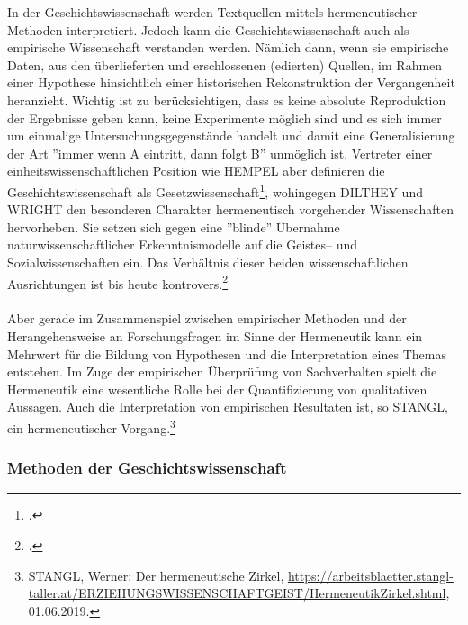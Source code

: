 \documentclass[12pt,a4paper]{article}
\begin{document}
In der Geschichtswissenschaft werden Textquellen mittels hermeneutischer Methoden interpretiert. Jedoch kann die Geschichtswissenschaft auch als empirische Wissenschaft verstanden werden. Nämlich dann, wenn sie empirische Daten, aus den überlieferten und erschlossenen (edierten) Quellen, im Rahmen einer Hypothese hinsichtlich einer historischen Rekonstruktion der Vergangenheit heranzieht. Wichtig ist zu berücksichtigen, dass es keine absolute Reproduktion der Ergebnisse geben kann, keine Experimente möglich sind und es sich immer um einmalige Untersuchungsgegenstände handelt und damit eine Generalisierung der Art ''immer wenn A eintritt, dann folgt B'' unmöglich ist. Vertreter einer einheitswissenschaftlichen Position wie HEMPEL aber definieren die Geschichtswissenschaft als Gesetzwissenschaft\footcite[][S.79-80]{nussel2018offenbarung}, wohingegen DILTHEY und WRIGHT den besonderen Charakter hermeneutisch vorgehender Wissenschaften hervorheben. Sie setzen sich gegen eine ''blinde'' Übernahme naturwissenschaftlicher Erkenntnismodelle auf die Geistes-- und Sozialwissenschaften ein. Das Verhältnis dieser beiden wissenschaftlichen Ausrichtungen ist bis heute kontrovers.\footcite{wellmer1979georg}
\\
\\
Aber gerade im Zusammenspiel zwischen empirischer Methoden und der Herangehensweise an Forschungsfragen im Sinne der Hermeneutik kann ein Mehrwert für die Bildung von Hypothesen und die Interpretation eines Themas entstehen. Im Zuge der empirischen Überprüfung von Sachverhalten spielt die Hermeneutik eine wesentliche Rolle bei der Quantifizierung von qualitativen Aussagen. Auch die Interpretation von empirischen Resultaten ist, so STANGL, ein hermeneutischer Vorgang.\footnote{STANGL, Werner: Der hermeneutische Zirkel, \protect\url{https://arbeitsblaetter.stangl-taller.at/ERZIEHUNGSWISSENSCHAFTGEIST/HermeneutikZirkel.shtml}, 01.06.2019.}

\subsubsection{Methoden der Geschichtswissenschaft}
\label{Methoden}
\end{document}
